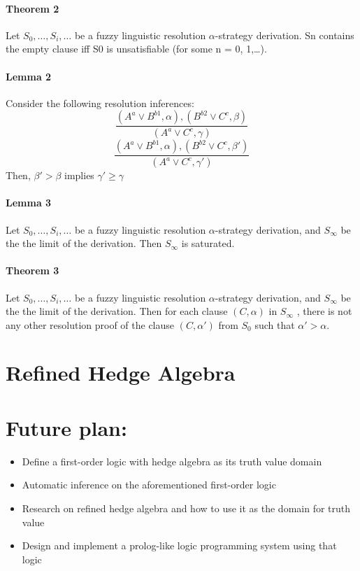 \documentclass[26pt,fleqn,]{article}
\begin{document}
\paragraph{Theorem 2}
Let $S_{0},\ldots,S_{i},\ldots$ be a fuzzy linguistic resolution $\alpha$-strategy derivation.
Sn contains the empty clause iff S0 is unsatisfiable (for some n = 0, 1,\ldots).
\paragraph{Lemma 2} 
Consider the following resolution inferences:
\[ \frac{(A^{a} \vee B^{b1}, \alpha), (B^{b2} \vee C^{c}, \beta)} {(A^{a} \vee C^{c}, \gamma)}\]
\[\frac{(A^{a} \vee B^{b1}, \alpha), (B^{b2} \vee C^{c}, \beta')} {(A^{a} \vee C^{c}, \gamma')}\]
Then, $\beta' > \beta$ implies $\gamma' \ge \gamma$

\paragraph{Lemma 3} Let $S_{0},\ldots,S_{i},\ldots$ be a fuzzy linguistic 
resolution $\alpha$-strategy derivation, and $S_{\infty}$ be the the limit of the derivation.
Then $S_{\infty}$ is saturated.

\paragraph{Theorem 3} Let $S_{0},\ldots,S_{i},\ldots$ be a fuzzy linguistic 
resolution $\alpha$-strategy derivation, and $S_{\infty}$ be the the limit of the derivation. 
Then for each clause $(C, \alpha)$ in $S_{\infty}$ , there is not any other resolution proof 
of the clause $(C, \alpha')$ from $S_{0}$ such that $\alpha' > \alpha$.

\section{Refined Hedge Algebra}
\section{Future plan:}
\begin{itemize}
	\item  Define a first-order logic with hedge algebra as its truth value domain
	\item  Automatic inference on the aforementioned first-order logic	
	\item  Research on refined hedge algebra and how to use it as the domain
		for truth value
	\item  Design and implement a prolog-like logic programming system using 
		that logic
\end{itemize}
\end{document}
